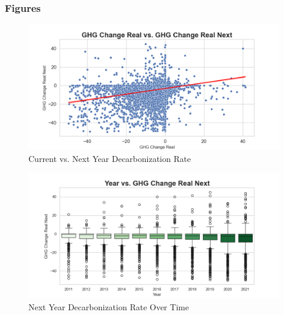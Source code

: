 \subsubsection{Figures}

\begin{figure}[H]
\centering
  \includegraphics[width=\textwidth]{figures/ghg_change_real_vs_ghg_change_real_next.png}
\caption{Current vs. Next Year Decarbonization Rate}
\label{fig:ghg_change_real_vs_ghg_change_real_next}
\end{figure}

\begin{figure}[H]
\centering
  \includegraphics[width=\textwidth]{figures/year_vs_ghg_change_real_next.png}
\caption{Next Year Decarbonization Rate Over Time}
\label{fig:ghg_change_real_vs_year}
\end{figure}

    


